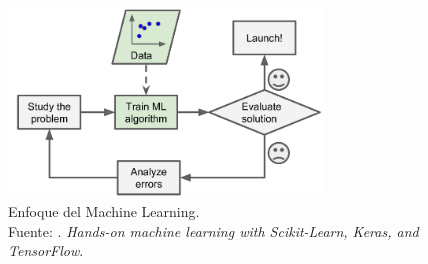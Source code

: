 \begin{figure}[H]
	\begin{center}
		\includegraphics[width=0.75\textwidth]{2/figures/enfoque_ml.png}
		\caption[Enfoque del Machine Learning]{Enfoque del Machine Learning. \\
		Fuente: \cite{bk_geron2022handml}. \textit{Hands-on machine learning with Scikit-Learn, Keras, and TensorFlow}.}
		\label{2:fig209}
	\end{center}
\end{figure}

